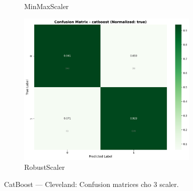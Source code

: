 \begin{figure}[H]
\begin{subfigure}[b]{0.31\textwidth}
\caption{MinMaxScaler}
\label{fig:cat_clev_cm_minmax}
\end{subfigure}\hfill
\begin{subfigure}[b]{0.31\textwidth}
\centering
\includegraphics[width=0.95\textwidth]{Result/cleveland_dataset/confusion_matrices/catboost_numeric_dataset_RobustScaler.png}
\caption{RobustScaler}
\label{fig:cat_clev_cm_robust}
\end{subfigure}
\caption{CatBoost — Cleveland: Confusion matrices cho 3 scaler.}
\label{fig:cat_clev_confusions}
\end{figure}

